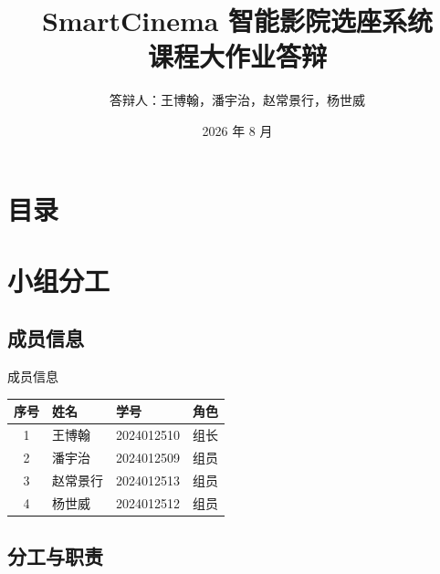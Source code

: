 \documentclass{beamer}
\title[SmartCinema]{SmartCinema 智能影院选座系统\\[2mm] 课程大作业答辩}
\author[豆浆糖油饼]{答辩人：王博翰，潘宇治，赵常景行，杨世威}
\institute[清华大学]{\small 清华大学未央书院}
\date{\small \vskip -10pt 2026 年 8 月}
\begin{document}
\begin{frame}
	\maketitle
\end{frame}

\section*{目录}
\frame{
  \frametitle{\secname}
  \tableofcontents[hideallsubsections]
}

\section{小组分工}

\subsection{成员信息}

\begin{frame}{成员信息}
  \begin{table}[htbp]
    \small
    \centering
    \begin{tabular}{cp{}p{}p{}}
      \toprule
      序号 & 姓名 & 学号 & 角色 \\
      \midrule
      1 & 王博翰 & 2024012510 & 组长 \\
      2 & 潘宇治 & 2024012509 & 组员 \\
      3 & 赵常景行 & 2024012513 & 组员 \\
      4 & 杨世威 & 2024012512 & 组员 \\
      \bottomrule
    \end{tabular}
  \end{table}
\end{frame}

\subsection{分工与职责}
\end{document}
